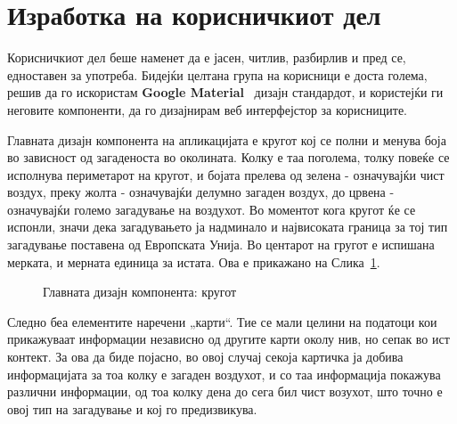 \documentclass{uvamscse}
\begin{document}
\section{Изработка на корисничкиот дел}

Корисничкиот дел беше наменет да е јасен, читлив, разбирлив и пред се, едноставен за употреба. Бидејќи целтана група на корисници е доста голема, решив да го искористам \textbf{Google Material}~\cite{googlemat} дизајн стандардот, и користејќи ги неговите компоненти, да го дизајнирам веб интерфејстор за корисниците.
\vspace{5mm}


Главната дизајн компонента на апликацијата е кругот кој се полни и менува боја во зависност од загаденоста во околината. Колку е таа поголема, толку повеќе се исполнува периметарот на кругот, и бојата прелева од зелена - означувајќи чист воздух, преку жолта - означувајќи делумно загаден воздух, до црвена - означувајќи големо загадување на воздухот. Во моментот кога кругот ќе се испонли, значи дека загадувањето ја надминало и највисоката граница за тој тип загадување поставена од Европската Унија. Во центарот на гругот е испишана мерката, и мерната единица за истата. Ова е прикажано на Слика~\ref{fig:krug}.
\vspace{5mm}


\begin{figure}[H]
\centering
  \caption{Главната дизајн компонента: кругот}
  \label{fig:krug}
\end{figure}

Следно беа елементите наречени „карти“. Тие се мали целини на податоци кои прикажуваат информации независно од другите карти околу нив, но сепак во ист контект. За ова да биде појасно, во овој случај секоја картичка ја добива информацијата за тоа колку е загаден воздухот, и со таа информација покажува различни информации, од тоа колку дена до сега бил чист возухот, што точно е овој тип на загадување и кој го предизвикува. 
\vspace{5mm}
\end{document}
